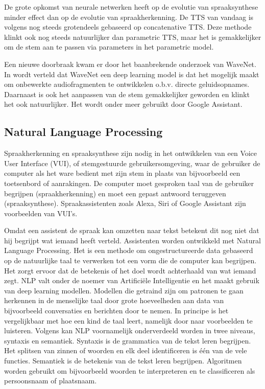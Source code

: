 De grote opkomst van neurale netwerken heeft op de evolutie van spraaksynthese minder effect dan op de evolutie van spraakherkenning. De \gls{TTS} van vandaag is volgens \textcite{Oord2016} nog steeds grotendeels gebaseerd op concatenative \gls{TTS}. Deze methode klinkt ook nog steeds natuurlijker dan parametric \gls{TTS}, maar het is gemakkelijker om de stem aan te passen via parameters in het parametric model.

Een nieuwe doorbraak kwam er door het baanbrekende onderzoek van WaveNet. In \textcite{Singh2018} wordt verteld dat WaveNet een deep learning model is dat het mogelijk maakt om onbewerkte audiofragmenten te ontwikkelen o.b.v. directe geluidsopnames. Daarnaast is ook het aanpassen van de stem gemakkelijker geworden en klinkt het ook natuurlijker. Het wordt onder meer gebruikt door Google Assistant.
 
\subsection{Natural Language Processing}

Spraakherkenning en spraaksynthese zijn nodig in het ontwikkelen van een Voice User Interface (VUI), of stemgestuurde gebruikersomgeving, waar de gebruiker de computer als het ware bedient met zijn stem in plaats van bijvoorbeeld een toetsenbord of aanrakingen. De computer moet gesproken taal van de gebruiker begrijpen (spraakherkenning) en moet een gepast antwoord teruggeven (spraaksynthese). Spraakassistenten zoals Alexa, Siri of Google Assistant zijn voorbeelden van VUI's.

Omdat een assistent de spraak kan omzetten naar tekst betekent dit nog niet dat hij begrijpt wat iemand heeft verteld. Assistenten worden ontwikkeld met Natural Language Processing. Het is een methode om ongestructureerde data gebaseerd op de natuurlijke taal te verwerken tot een vorm die de computer kan begrijpen. Het zorgt ervoor dat de betekenis of het doel wordt achterhaald van wat iemand zegt. \gls{NLP} valt onder de noemer van Artificiële Intelligentie en het maakt gebruik van deep learning modellen. Modellen die getraind zijn om patronen te gaan herkennen in de menselijke taal door grote hoeveelheden aan data van bijvoorbeeld conversaties en berichten door te nemen. In principe is het vergelijkbaar met hoe een kind de taal leert, namelijk door naar voorbeelden te luisteren. \autocite{Rouse2017}
Volgens \textcite{Garbade2018} kan \gls{NLP} voornamelijk onderverdeeld worden in twee niveaus, syntaxis en semantiek. Syntaxis is de grammatica van de tekst leren begrijpen. Het splitsen van zinnen of woorden en elk deel identificeren is één van de vele functies. Semantiek is de betekenis van de tekst leren begrijpen. Algoritmen worden gebruikt om bijvoorbeeld woorden te interpreteren en te classificeren als persoonsnaam of plaatsnaam.

